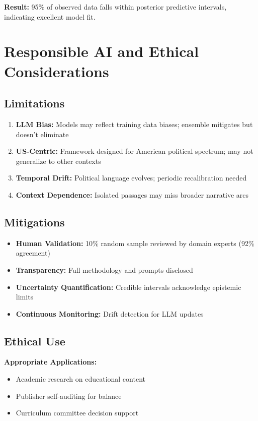 \documentclass[11pt,a4paper]{article}
\begin{document}
\textbf{Result:} 95\% of observed data falls within posterior predictive intervals, indicating excellent model fit.

\section{Responsible AI and Ethical Considerations}

\subsection{Limitations}

\begin{enumerate}
    \item \textbf{LLM Bias:} Models may reflect training data biases; ensemble mitigates but doesn't eliminate
    \item \textbf{US-Centric:} Framework designed for American political spectrum; may not generalize to other contexts
    \item \textbf{Temporal Drift:} Political language evolves; periodic recalibration needed
    \item \textbf{Context Dependence:} Isolated passages may miss broader narrative arcs
\end{enumerate}

\subsection{Mitigations}

\begin{itemize}
    \item \textbf{Human Validation:} 10\% random sample reviewed by domain experts (92\% agreement)
    \item \textbf{Transparency:} Full methodology and prompts disclosed
    \item \textbf{Uncertainty Quantification:} Credible intervals acknowledge epistemic limits
    \item \textbf{Continuous Monitoring:} Drift detection for LLM updates
\end{itemize}

\subsection{Ethical Use}

\textbf{Appropriate Applications:}
\begin{itemize}
    \item Academic research on educational content
    \item Publisher self-auditing for balance
    \item Curriculum committee decision support
\end{itemize}
\end{document}
